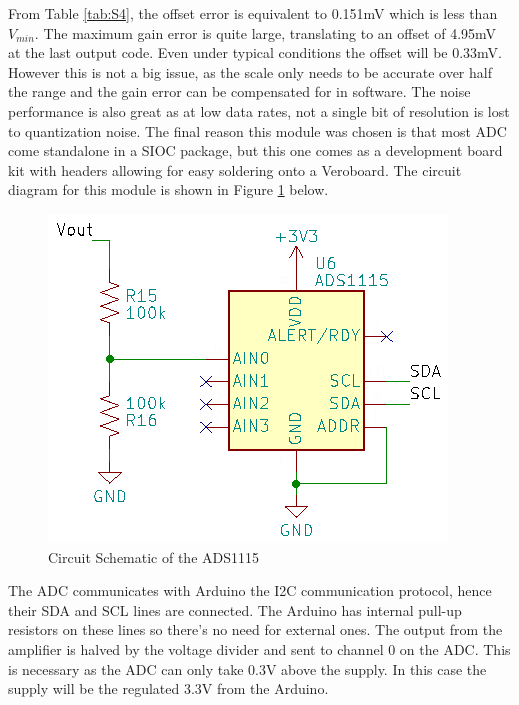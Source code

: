 \documentclass[class=report,11pt,crop=false]{standalone}
\begin{document}
	From Table \ref{tab:S4}, the offset error is equivalent to 0.151mV which is less than $V_{min}$. The maximum gain error is quite large, translating to an offset of 4.95mV at the last output code. Even under typical conditions the offset will be 0.33mV. However this is not a big issue, as the scale only needs to be accurate over half the range and the gain error can be compensated for in software. The noise performance is also great as at low data rates, not a single bit of resolution is lost to quantization noise. The final reason this module was chosen is that most ADC come standalone in a SIOC package, but this one comes as a development board kit with headers allowing for easy soldering onto a Veroboard. The circuit diagram for this module is shown in Figure \ref{fig:S6} below. 
	\begin{figure}[h!]
		\centering
		\includegraphics[width=0.4\linewidth]{Figures/ADC.png}
		\caption{Circuit Schematic of the ADS1115}
		\label{fig:S6}
	\end{figure}
	The ADC communicates with Arduino the I2C communication protocol, hence their SDA and SCL lines are connected. The Arduino has internal pull-up resistors on these lines so there's no need for external ones. The output from the amplifier is halved by the voltage divider and sent to channel 0 on the ADC. This is necessary as the ADC can only take 0.3V above the supply. In this case the supply will be the regulated 3.3V from the Arduino.
	
\end{document}
